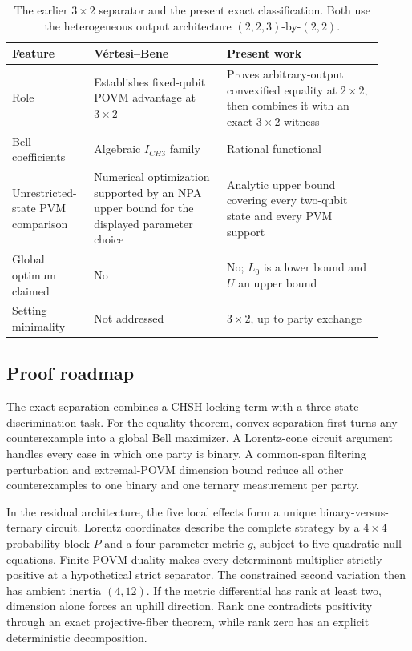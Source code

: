 \documentclass[11pt]{article}
\theoremstyle{definition}
\begin{document}
\begin{table}[t]
\centering
\small
\caption{The earlier \(3\times2\) separator and the present exact
classification. Both use the heterogeneous output architecture
\((2,2,3)\)-by-\((2,2)\).}
\label{tab:comparison}
\begin{tabular}{@{}
>{\raggedright\arraybackslash}p{0.20\linewidth}
>{\raggedright\arraybackslash}p{0.33\linewidth}
>{\raggedright\arraybackslash}p{0.39\linewidth}@{}}
\toprule
Feature & V\'ertesi--Bene \cite{vertesi2010} & Present work\\
\midrule
Role & Establishes fixed-qubit POVM advantage at \(3\times2\) &
Proves arbitrary-output convexified equality at \(2\times2\), then combines it
with an exact \(3\times2\) witness\\
Bell coefficients & Algebraic \(I_{CH3}\) family & Rational functional\\
Unrestricted-state PVM comparison & Numerical optimization supported by an
NPA upper bound for the displayed parameter choice & Analytic upper bound
covering every two-qubit state and every PVM support\\
Global optimum claimed & No & No; \(L_0\) is a lower bound and \(U\) an upper
bound\\
Setting minimality & Not addressed & \(3\times2\), up to party exchange\\
\bottomrule
\end{tabular}
\end{table}

\subsection*{Proof roadmap}

The exact separation combines a CHSH locking term with a three-state
discrimination task. For the equality theorem, convex separation first turns
any counterexample into a global Bell maximizer. A Lorentz-cone circuit
argument handles every case in which one party is binary. A common-span
filtering perturbation and extremal-POVM dimension bound reduce all other
counterexamples to one binary and one ternary measurement per party.

In the residual architecture, the five local effects form a unique
binary-versus-ternary circuit. Lorentz coordinates describe the complete
strategy by a \(4\times4\) probability block \(P\) and a four-parameter
metric \(g\), subject to five quadratic null equations. Finite POVM duality
makes every determinant multiplier strictly positive at a hypothetical strict
separator. The constrained second variation then has ambient inertia
\((4,12)\). If the metric differential has rank at least two, dimension alone
forces an uphill direction. Rank one contradicts positivity through an exact
projective-fiber theorem, while rank zero has an explicit deterministic
decomposition.
\end{document}
